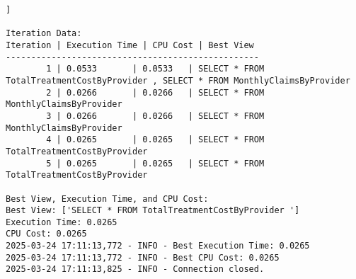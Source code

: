 

\begin{lstlisting}[style=pythonstyle, caption={Output from python code }, label={lst:pso_Output}]]

Iteration Data:
Iteration | Execution Time | CPU Cost | Best View
--------------------------------------------------
        1 | 0.0533       | 0.0533   | SELECT * FROM TotalTreatmentCostByProvider , SELECT * FROM MonthlyClaimsByProvider 
        2 | 0.0266       | 0.0266   | SELECT * FROM MonthlyClaimsByProvider 
        3 | 0.0266       | 0.0266   | SELECT * FROM MonthlyClaimsByProvider 
        4 | 0.0265       | 0.0265   | SELECT * FROM TotalTreatmentCostByProvider 
        5 | 0.0265       | 0.0265   | SELECT * FROM TotalTreatmentCostByProvider 

Best View, Execution Time, and CPU Cost:
Best View: ['SELECT * FROM TotalTreatmentCostByProvider ']
Execution Time: 0.0265
CPU Cost: 0.0265
2025-03-24 17:11:13,772 - INFO - Best Execution Time: 0.0265
2025-03-24 17:11:13,772 - INFO - Best CPU Cost: 0.0265
2025-03-24 17:11:13,825 - INFO - Connection closed.

\end{lstlisting}